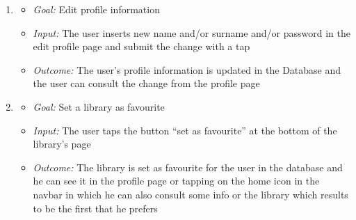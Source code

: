 \begin{enumerate}
\item 
\begin{itemize}
	\item \emph{Goal: }Edit profile information
	\item \emph{Input: }The user inserts new name and/or surname and/or password in the edit profile page and submit the change with a tap
	\item \emph{Outcome: }The user’s profile information is updated in the Database and the user can consult the change from the profile page
\end{itemize}

\item 
\begin{itemize}
	\item \emph{Goal: }Set a library as favourite
	\item \emph{Input: }The user taps the button “set as favourite” at the bottom of the library’s page
	\item \emph{Outcome: }The library is set as favourite for the user in the database and he can see it in the profile page or tapping on the home icon in the navbar in which he can also consult some info or the library which results to be the first that he prefers
\end{itemize}	
\end{enumerate}